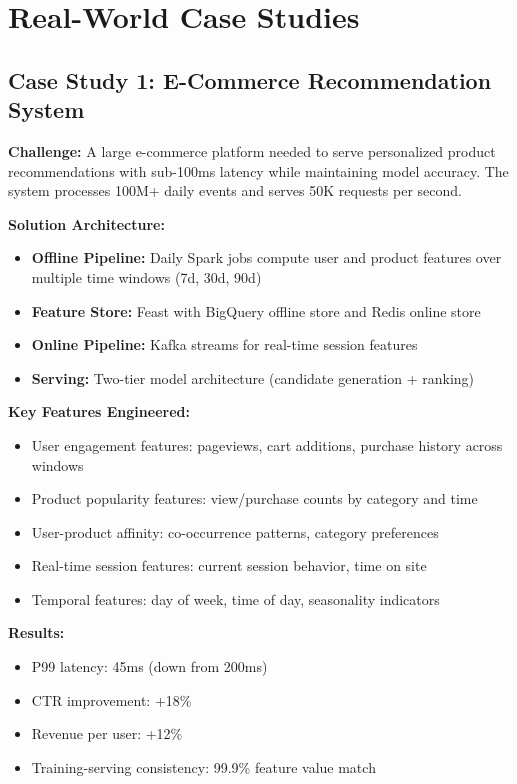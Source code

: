\section{Real-World Case Studies}

\subsection{Case Study 1: E-Commerce Recommendation System}

\textbf{Challenge:} A large e-commerce platform needed to serve personalized product recommendations with sub-100ms latency while maintaining model accuracy. The system processes 100M+ daily events and serves 50K requests per second.

\textbf{Solution Architecture:}
\begin{itemize}
    \item \textbf{Offline Pipeline:} Daily Spark jobs compute user and product features over multiple time windows (7d, 30d, 90d)
    \item \textbf{Feature Store:} Feast with BigQuery offline store and Redis online store
    \item \textbf{Online Pipeline:} Kafka streams for real-time session features
    \item \textbf{Serving:} Two-tier model architecture (candidate generation + ranking)
\end{itemize}

\textbf{Key Features Engineered:}
\begin{itemize}
    \item User engagement features: pageviews, cart additions, purchase history across windows
    \item Product popularity features: view/purchase counts by category and time
    \item User-product affinity: co-occurrence patterns, category preferences
    \item Real-time session features: current session behavior, time on site
    \item Temporal features: day of week, time of day, seasonality indicators
\end{itemize}

\textbf{Results:}
\begin{itemize}
    \item P99 latency: 45ms (down from 200ms)
    \item CTR improvement: +18\%
    \item Revenue per user: +12\%
    \item Training-serving consistency: 99.9\% feature value match
\end{itemize}

